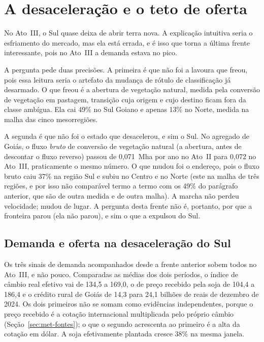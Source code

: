 \section{A desaceleração e o teto de oferta}
\label{sec:res-perna4}

No Ato~III, o Sul quase deixa de abrir terra nova. A explicação intuitiva seria o esfriamento do mercado, mas ela está errada, e é isso que torna a última
frente interessante, pois no Ato~III a demanda estava no pico.

A pergunta pede duas precisões. A primeira é que não foi a lavoura que freou,
pois essa leitura seria o artefato da mudança de rótulo de classificação já
desarmado. O que freou é a abertura de vegetação natural, medida pela conversão
de vegetação em pastagem, transição cuja origem e cujo destino ficam fora da
classe ambígua. Ela cai 49\% no Sul Goiano e apenas 13\% no Norte, medida na malha
das cinco mesorregiões.

A segunda é que não foi o estado que desacelerou, e sim o Sul. No agregado de
Goiás, o fluxo \emph{bruto} de conversão de vegetação natural (a abertura, antes de
descontar o fluxo reverso) passou de 0,071~Mha por ano no Ato~II para 0,072 no
Ato~III, praticamente o mesmo número. O que mudou foi o endereço, pois o fluxo
bruto caiu 37\% na região Sul e subiu no Centro e no Norte (este na malha de
três regiões, e por isso não comparável termo a termo com os 49\% do parágrafo
anterior, que são de outra medida e de outra malha). A marcha não perdeu
velocidade; mudou de lugar. A pergunta desta frente não é, portanto, por que a
fronteira parou (ela não parou), e sim o que a expulsou do Sul.

\subsection{Demanda e oferta na desaceleração do Sul}

Os três sinais de demanda acompanhados desde a frente anterior sobem todos no
Ato~III, e não pouco. Comparadas as médias dos dois períodos, o índice de
câmbio real efetivo vai de 134,5 a 169,0, o de preço recebido pela soja de
104,4 a 186,4 e o crédito rural de Goiás de 14,3 para 24,1 bilhões de reais de
dezembro de 2024. Os dois primeiros não se somam como evidências
independentes, porque o preço recebido é a cotação internacional multiplicada
pelo próprio câmbio (Seção~\ref{sec:met-fontes}); o que o segundo acrescenta ao
primeiro é a alta da cotação em dólar. A soja efetivamente plantada cresce 38\% na mesma janela.


